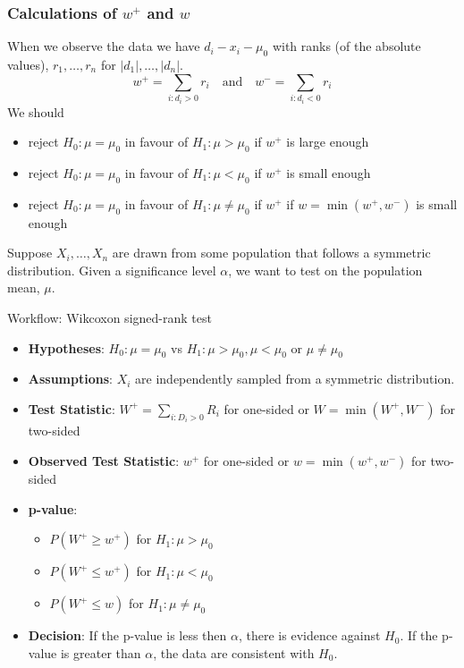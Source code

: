 \documentclass[a4paper]{article}
\begin{document}
\subsubsection{Calculations of \( w^+ \) and \( w \)}
When we observe the data we have \( d_i - x_i - \mu_0 \) with ranks (of the absolute values), \( r_1,\dotsc,r_n \) for \( \lvert d_1 \rvert, \dotsc, \lvert d_n \rvert \).
\[
	w^+ = \sum_{i: d_i > 0} r_i \quad\text{and}\quad w^- = \sum_{i: d_i < 0} r_i
\]
We should
\begin{itemize}
	\item reject \( H_0: \mu = \mu_0 \) in favour of \( H_1: \mu > \mu_0 \) if \( w^+ \) is large enough
	\item reject \( H_0: \mu = \mu_0 \) in favour of \( H_1: \mu < \mu_0 \) if \( w^+ \) is small enough
	\item reject \( H_0: \mu = \mu_0 \) in favour of \( H_1: \mu \neq \mu_0 \) if \( w^+ \) if \( w = \min(w^+,w^-) \) is small enough
\end{itemize}
Suppose \( X_i,\dotsc,X_n \) are drawn from some population that follows a symmetric distribution. Given a significance level \( \alpha \), we want to test on the population mean, \( \mu \).
\begin{redbox}{Workflow: Wikcoxon signed-rank test}
	\begin{itemize}
		\item \textbf{Hypotheses}: \( H_0: \mu = \mu_0 \) vs \( H_1: \mu > \mu_0, \mu < \mu_0 \) or \( \mu \neq \mu_0 \)
		\item \textbf{Assumptions}: \( X_i \) are independently sampled from a symmetric distribution.
		\item \textbf{Test Statistic}: \( W^+ = \sum_{i: D_i > 0} R_i \) for one-sided or \( W = \min(W^+,W^-) \) for two-sided
		\item \textbf{Observed Test Statistic}: \( w^+ \) for one-sided or \( w = \min(w^+,w^-) \) for two-sided
		\item \textbf{p-value}:
		\begin{itemize}
			\item \( P(W^+ \geq w^+) \) for \( H_1: \mu > \mu_0 \)
			\item \( P(W^+ \leq w^+) \) for \( H_1: \mu < \mu_0 \) 
			\item \( P(W^+ \leq w) \) for \( H_1: \mu \neq \mu_0 \) 
		\end{itemize}
		\item \textbf{Decision}: If the p-value is less then \( \alpha \), there is evidence against \( H_0 \). If the p-value is greater than \( \alpha \), the data are consistent with \( H_0 \).
	\end{itemize}
\end{redbox}
\end{document}
